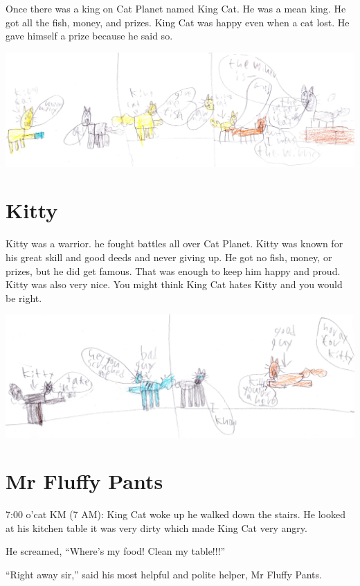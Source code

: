 \documentclass[12pt,oneside]{krantz}
\begin{document}
Once there was a king on Cat Planet named King Cat. He was a mean king.
He got all the fish, money, and prizes. King Cat was happy even when a
cat lost. He gave himself a prize because he said so.

\includegraphics{img/thewinner.jpg}

\hypertarget{kitty}{%
\chapter{Kitty}\label{kitty}}

Kitty was a warrior. he fought battles all over Cat Planet. Kitty was
known for his great skill and good deeds and never giving up. He got no
fish, money, or prizes, but he did get famous. That was enough to keep
him happy and proud. Kitty was also very nice. You might think King Cat
hates Kitty and you would be right.

\includegraphics{img/kittyhero.jpg}

\hypertarget{mr-fluffy-pants}{%
\chapter{Mr Fluffy Pants}\label{mr-fluffy-pants}}

7:00 o'cat KM (7 AM): King Cat woke up he walked down the stairs. He
looked at his kitchen table it was very dirty which made King Cat very
angry.

He screamed, ``Where's my food! Clean my table!!!''

``Right away sir,'' said his most helpful and polite helper, Mr Fluffy
Pants.
\end{document}
